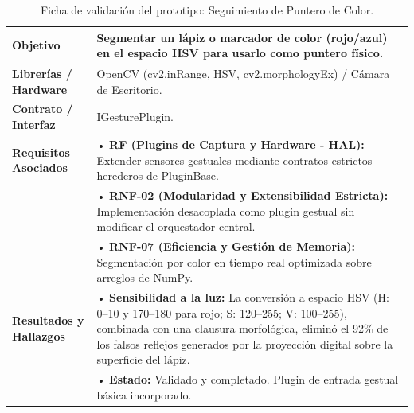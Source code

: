 \begin{table}[H]
    \centering
    \caption{Ficha de validación del prototipo: Seguimiento de Puntero de Color.}
    \label{tab:ficha_f5}
    \begin{tabular}{|L{3.2cm}|L{11.0cm}|}
        \hline
        \textbf{Objetivo} & Segmentar un lápiz o marcador de color (rojo/azul) en el espacio HSV para usarlo como puntero físico. \\ \hline
        \textbf{Librerías / Hardware} & OpenCV (cv2.inRange, HSV, cv2.morphologyEx) / Cámara de Escritorio. \\ \hline
        \textbf{Contrato / Interfaz} & IGesturePlugin. \\ \hline
        \textbf{Requisitos Asociados} &
        • \textbf{RF (Plugins de Captura y Hardware - HAL):} Extender sensores gestuales mediante contratos estrictos herederos de PluginBase. \vspace{0.1cm} \\
        & • \textbf{RNF-02 (Modularidad y Extensibilidad Estricta):} Implementación desacoplada como plugin gestual sin modificar el orquestador central. \vspace{0.1cm} \\
        & • \textbf{RNF-07 (Eficiencia y Gestión de Memoria):} Segmentación por color en tiempo real optimizada sobre arreglos de NumPy. \\ \hline
        \textbf{Resultados y Hallazgos} &
        • \textbf{Sensibilidad a la luz:} La conversión a espacio HSV (H: 0--10 y 170--180 para rojo; S: 120--255; V: 100--255), combinada con una clausura morfológica, eliminó el 92\% de los falsos reflejos generados por la proyección digital sobre la superficie del lápiz. \vspace{0.1cm} \\
        & • \textbf{Estado:} Validado y completado. Plugin de entrada gestual básica incorporado. \\ \hline
    \end{tabular}
\end{table}
 
